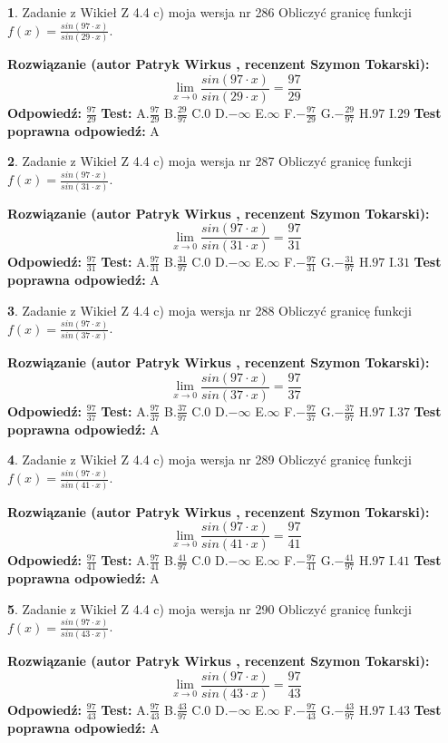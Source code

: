 \documentclass[12pt, a4paper]{article}
\theoremstyle{definition} %
\newtheorem{zad}{}
\newcommand{\zadStart}[1]{\begin{zad}#1\newline}
\newcommand{\zadStop}{\end{zad}}
\newcommand{\rozwStart}[2]{\noindent \textbf{Rozwiązanie (autor #1 , recenzent #2): }\newline}
\newcommand{\rozwStop}{\newline}
\newcommand{\odpStart}{\noindent \textbf{Odpowiedź:}\newline}
\newcommand{\odpStop}{\newline}
\newcommand{\testStart}{\noindent \textbf{Test:}\newline}
\newcommand{\testStop}{\newline}
\newcommand{\kluczStart}{\noindent \textbf{Test poprawna odpowiedź:}\newline}
\newcommand{\kluczStop}{\newline}
\begin{document}
\zadStart{Zadanie z Wikieł Z 4.4 c) moja wersja nr 286}
Obliczyć granicę funkcji $f(x)=\frac{sin(97\cdot x)}{sin(29\cdot x)}$.
\zadStop
\rozwStart{Patryk Wirkus}{Szymon Tokarski}
$$\lim\limits_{x\to 0}\frac{sin(97\cdot x)}{sin(29\cdot x)}=
\frac{97}{29}$$
\rozwStop
\odpStart
$\frac{97}{29}$
\odpStop
\testStart
A.$\frac{97}{29}$
B.$\frac{29}{97}$
C.$0$
D.$-\infty$
E.$\infty$
F.$-\frac{97}{29}$
G.$-\frac{29}{97}$
H.$97$
I.$29$
\testStop
\kluczStart
A
\kluczStop



\zadStart{Zadanie z Wikieł Z 4.4 c) moja wersja nr 287}
Obliczyć granicę funkcji $f(x)=\frac{sin(97\cdot x)}{sin(31\cdot x)}$.
\zadStop
\rozwStart{Patryk Wirkus}{Szymon Tokarski}
$$\lim\limits_{x\to 0}\frac{sin(97\cdot x)}{sin(31\cdot x)}=
\frac{97}{31}$$
\rozwStop
\odpStart
$\frac{97}{31}$
\odpStop
\testStart
A.$\frac{97}{31}$
B.$\frac{31}{97}$
C.$0$
D.$-\infty$
E.$\infty$
F.$-\frac{97}{31}$
G.$-\frac{31}{97}$
H.$97$
I.$31$
\testStop
\kluczStart
A
\kluczStop



\zadStart{Zadanie z Wikieł Z 4.4 c) moja wersja nr 288}
Obliczyć granicę funkcji $f(x)=\frac{sin(97\cdot x)}{sin(37\cdot x)}$.
\zadStop
\rozwStart{Patryk Wirkus}{Szymon Tokarski}
$$\lim\limits_{x\to 0}\frac{sin(97\cdot x)}{sin(37\cdot x)}=
\frac{97}{37}$$
\rozwStop
\odpStart
$\frac{97}{37}$
\odpStop
\testStart
A.$\frac{97}{37}$
B.$\frac{37}{97}$
C.$0$
D.$-\infty$
E.$\infty$
F.$-\frac{97}{37}$
G.$-\frac{37}{97}$
H.$97$
I.$37$
\testStop
\kluczStart
A
\kluczStop



\zadStart{Zadanie z Wikieł Z 4.4 c) moja wersja nr 289}
Obliczyć granicę funkcji $f(x)=\frac{sin(97\cdot x)}{sin(41\cdot x)}$.
\zadStop
\rozwStart{Patryk Wirkus}{Szymon Tokarski}
$$\lim\limits_{x\to 0}\frac{sin(97\cdot x)}{sin(41\cdot x)}=
\frac{97}{41}$$
\rozwStop
\odpStart
$\frac{97}{41}$
\odpStop
\testStart
A.$\frac{97}{41}$
B.$\frac{41}{97}$
C.$0$
D.$-\infty$
E.$\infty$
F.$-\frac{97}{41}$
G.$-\frac{41}{97}$
H.$97$
I.$41$
\testStop
\kluczStart
A
\kluczStop



\zadStart{Zadanie z Wikieł Z 4.4 c) moja wersja nr 290}
Obliczyć granicę funkcji $f(x)=\frac{sin(97\cdot x)}{sin(43\cdot x)}$.
\zadStop
\rozwStart{Patryk Wirkus}{Szymon Tokarski}
$$\lim\limits_{x\to 0}\frac{sin(97\cdot x)}{sin(43\cdot x)}=
\frac{97}{43}$$
\rozwStop
\odpStart
$\frac{97}{43}$
\odpStop
\testStart
A.$\frac{97}{43}$
B.$\frac{43}{97}$
C.$0$
D.$-\infty$
E.$\infty$
F.$-\frac{97}{43}$
G.$-\frac{43}{97}$
H.$97$
I.$43$
\testStop
\kluczStart
A
\kluczStop
\end{document}
